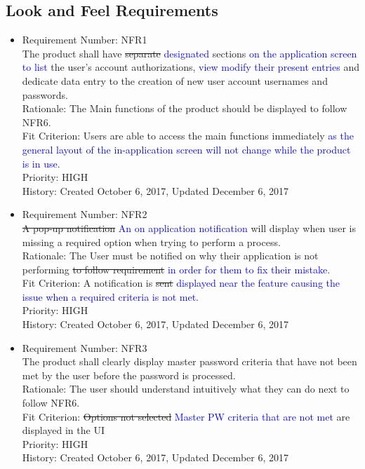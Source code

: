 \documentclass[12pt, titlepage]{article}
\begin{document}
\subsection{Look and Feel Requirements}
\begin{itemize}
	\item Requirement Number: NFR1\\
The product shall have \sout{separate} \textcolor{blue}{designated} sections \textcolor{blue}{on the application screen to list} the user’s account authorizations, \textcolor{blue}{view \/ modify their present entries} and dedicate data entry to the creation of new user account usernames and passwords.\\
Rationale: The Main functions of the product should be displayed to follow NFR6.\\
Fit Criterion: Users are able to access the main functions immediately \textcolor{blue}{as the general layout of the in-application screen will not change while the product is in use}.\\
Priority: HIGH\\
History: Created October 6, 2017, Updated December 6, 2017
	\item Requirement Number: NFR2\\
\sout{A pop-up notification} \textcolor{blue}{An on application notification} will display when user is missing a required option when trying to perform a process.\\
Rationale: The User must be notified on why their application is not performing \sout{to follow requirement} \textcolor{blue}{in order for them to fix their mistake}. \\
Fit Criterion: A notification is \sout{sent} \textcolor{blue}{displayed near the feature causing the issue when a required criteria is not met.}\\
Priority: HIGH\\
History: Created October 6, 2017, Updated December 6, 2017

	\item Requirement Number: NFR3\\
The product shall clearly display master password criteria that have not been met by the user before the password is processed.\\
Rationale: The user should understand intuitively what they can do next to follow NFR6.\\
Fit Criterion: \sout{Options not selected} \textcolor{blue}{Master PW criteria that are not met} are displayed in the UI \\
Priority: HIGH\\
History: Created October 6, 2017, Updated December 6, 2017


\end{itemize}
\end{document}
